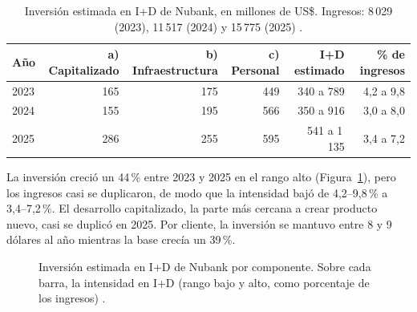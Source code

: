 \documentclass[11pt,letterpaper]{article}
\begin{document}
\begin{table}[H]
\centering
\small
\begin{tabular}{@{}lrrrrr@{}}
\toprule
Año & a) Capitalizado & b) Infraestructura & c) Personal
    & I+D estimado & \% de ingresos \\
\midrule
2023 & 165 & 175 & 449 & 340 a 789   & 4,2 a 9,8 \\
2024 & 155 & 195 & 566 & 350 a 916   & 3,0 a 8,0 \\
2025 & 286 & 255 & 595 & 541 a 1\,135 & 3,4 a 7,2 \\
\bottomrule
\end{tabular}
\caption{Inversión estimada en I+D de Nubank, en millones de US\$. Ingresos:
8\,029 (2023), 11\,517 (2024) y 15\,775 (2025) \parencite{nu2026}.}
\label{tab:id}
\end{table}

La inversión creció un 44\,\% entre 2023 y 2025 en el rango alto
(Figura~\ref{fig:inversion}), pero los ingresos casi se duplicaron, de modo
que la intensidad bajó de 4,2--9,8\,\% a 3,4--7,2\,\%. El desarrollo
capitalizado, la parte más cercana a crear producto nuevo, casi se duplicó en
2025. Por cliente, la inversión se mantuvo entre 8 y 9 dólares al año
mientras la base crecía un 39\,\%.

\begin{figure}[H]
\centering
{}
\caption{Inversión estimada en I+D de Nubank por componente. Sobre cada barra,
la intensidad en I+D (rango bajo y alto, como porcentaje de los ingresos)
\parencite{nu2026}.}
\label{fig:inversion}
\end{figure}
\end{document}
